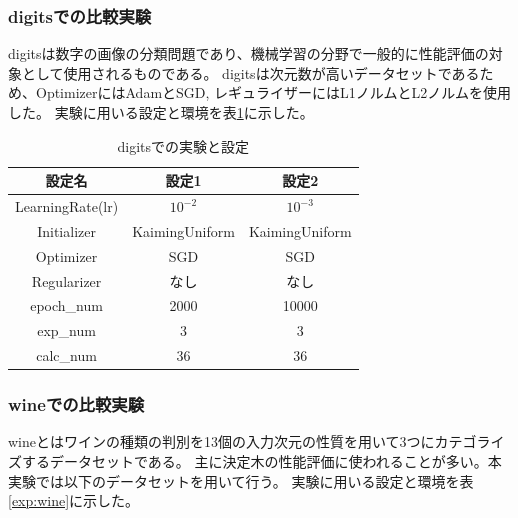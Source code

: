 \subsubsection{digitsでの比較実験}
\label{impl:digits}

digitsは数字の画像の分類問題であり、機械学習の分野で一般的に性能評価の対象として使用されるものである。
digitsは次元数が高いデータセットであるため、OptimizerにはAdamとSGD, レギュライザーにはL1ノルムとL2ノルムを使用した。
実験に用いる設定と環境を表\ref{exp:digits}に示した。

\begin{table}[htbp]
    \begin{center}
        \caption{digitsでの実験と設定}
        \label{exp:digits}
        \vspace{2mm} 
        \begin{tabular}{ |c|c|c| }
        設定名 & 設定1 & 設定2 \\
        \hline
        LearningRate(lr)         & $ 10^{-2} $ & $ 10^{-3} $ \\
        Initializer       & KaimingUniform &  KaimingUniform \\
        Optimizer           & SGD & SGD \\
        Regularizer     & なし & なし \\
        epoch\_num       & 2000 &  10000 \\
        exp\_num         & 3 & 3 \\
        calc\_num        & 36 & 36 \\
        \end{tabular}
    \end{center}
\end{table}



\subsubsection{wineでの比較実験}
\label{impl:wine}

wineとはワインの種類の判別を13個の入力次元の性質を用いて3つにカテゴライズするデータセットである。
主に決定木の性能評価に使われることが多い。本実験では以下のデータセットを用いて行う。
実験に用いる設定と環境を表\ref{exp:wine}に示した。


